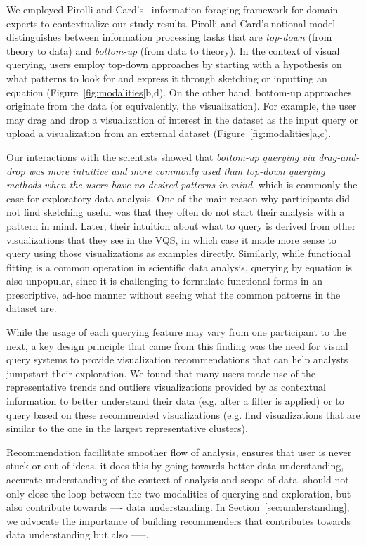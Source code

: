We employed Pirolli and Card's~\cite{Pirolli} information foraging framework for domain-experts to contextualize our study results. Pirolli and Card's notional model distinguishes between information processing tasks that are \textit{top-down} (from theory to data) and \textit{bottom-up} (from data to theory). In the context of visual querying, users employ top-down approaches by starting with a hypothesis on what patterns to look for and express it through sketching or inputting an equation (Figure~\ref{fig:modalities}b,d). On the other hand, bottom-up approaches originate from the data (or equivalently, the visualization). For example, the user may drag and drop a visualization of interest in the dataset as the input query or upload a visualization from an external dataset (Figure~\ref{fig:modalities}a,c). 
\par Our interactions with the scientists showed that \emph{bottom-up querying via drag-and-drop was more intuitive and more commonly used than top-down querying methods when the users have no desired patterns in mind}, which is commonly the case for exploratory data analysis. One of the main reason why participants did not find sketching useful was that they often do not start their analysis with a pattern in mind. Later, their intuition about what to query is derived from other visualizations that they see in the VQS, in which case it made more sense to query using those visualizations as examples directly. Similarly, while functional fitting is a common operation in scientific data analysis, querying by equation is also unpopular, since it is challenging to formulate functional forms in an prescriptive, ad-hoc manner without seeing what the common patterns in the dataset are. 
\par While the usage of each querying feature may vary from one participant to the next, a key design principle that came from this finding was the need for visual query systems to provide visualization recommendations that can help analysts jumpstart their exploration. We found that many users made use of the representative trends and outliers visualizations provided by \zv as contextual information to better understand their data (e.g. after a filter is applied) or to query based on these recommended visualizations (e.g. find visualizations that are similar to the one in the largest representative clusters). 
\par Recommendation facillitate smoother flow of analysis, ensures that user is never stuck or out of ideas. it does this by going towards better data understanding, accurate understanding of the context of analysis and scope of data. should not only close the loop between the two modalities of querying and exploration, but also contribute towards ---- data understanding. In Section~\ref{sec:understanding}, we advocate the importance of building recommenders that contributes towards data understanding but also -----. 

